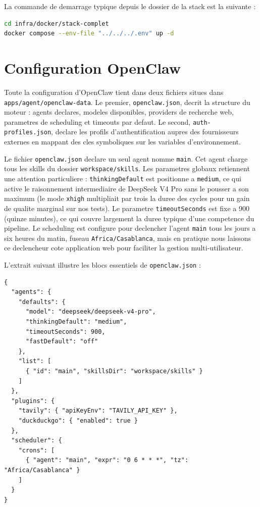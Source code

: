 \documentclass[12pt,a4paper,openany]{report}
\begin{document}
La commande de demarrage typique depuis le dossier de la stack est la suivante :

\begin{lstlisting}[language=bash,caption={Commande de demarrage de la stack de developpement}]
cd infra/docker/stack-complet
docker compose --env-file "../../../.env" up -d
\end{lstlisting}


\section{Configuration OpenClaw}
\label{sec:config-openclaw}

Toute la configuration d'OpenClaw tient dans deux fichiers situes dans \texttt{apps/agent/openclaw-data}. Le premier, \texttt{openclaw.json}, decrit la structure du moteur : agents declares, modeles disponibles, providers de recherche web, parametres de scheduling et timeouts par defaut. Le second, \texttt{auth-profiles.json}, declare les profils d'authentification aupres des fournisseurs externes en mappant des cles symboliques sur les variables d'environnement.

Le fichier \texttt{openclaw.json} declare un seul agent nomme \texttt{main}. Cet agent charge tous les skills du dossier \texttt{workspace/skills}. Les parametres globaux retiennent une attention particuliere : \texttt{thinkingDefault} est positionne a \texttt{medium}, ce qui active le raisonnement intermediaire de DeepSeek V4 Pro sans le pousser a son maximum (le mode \texttt{xhigh} multipliait par trois la duree des cycles pour un gain de qualite marginal sur nos tests). Le parametre \texttt{timeoutSeconds} est fixe a 900 (quinze minutes), ce qui couvre largement la duree typique d'une competence du pipeline. Le scheduling est configure pour declencher l'agent \texttt{main} tous les jours a six heures du matin, fuseau \texttt{Africa/Casablanca}, mais en pratique nous laissons ce declencheur cote application web pour faciliter la gestion multi-utilisateur.

L'extrait suivant illustre les blocs essentiels de \texttt{openclaw.json} :

\begin{lstlisting}[language={},caption={Extrait significatif de openclaw.json}]
{
  "agents": {
    "defaults": {
      "model": "deepseek/deepseek-v4-pro",
      "thinkingDefault": "medium",
      "timeoutSeconds": 900,
      "fastDefault": "off"
    },
    "list": [
      { "id": "main", "skillsDir": "workspace/skills" }
    ]
  },
  "plugins": {
    "tavily": { "apiKeyEnv": "TAVILY_API_KEY" },
    "duckduckgo": { "enabled": true }
  },
  "scheduler": {
    "crons": [
      { "agent": "main", "expr": "0 6 * * *", "tz": "Africa/Casablanca" }
    ]
  }
}
\end{lstlisting}
\end{document}
